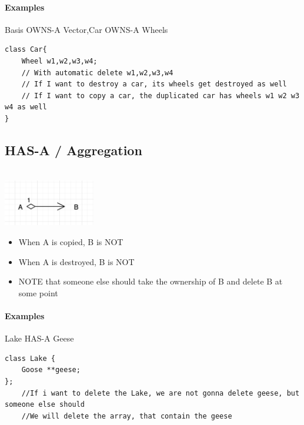 \documentclass{report}
\begin{document}
\paragraph{Examples} Basis OWNS-A Vector,Car OWNS-A Wheels
\begin{lstlisting}
class Car{
    Wheel w1,w2,w3,w4; 
    // With automatic delete w1,w2,w3,w4
    // If I want to destroy a car, its wheels get destroyed as well
    // If I want to copy a car, the duplicated car has wheels w1 w2 w3 w4 as well
}
\end{lstlisting}
\subsection{HAS-A / Aggregation}
\\
\includegraphics[width = 0.3\textwidth]{cs2}
\begin{itemize}
\item When A is copied, B is NOT
\item When A is destroyed, B is NOT
\item NOTE that someone else should take the ownership of B and delete B at some point
\end{itemize}
\paragraph{Examples}
Lake HAS-A Geese
\begin{lstlisting}
class Lake {
    Goose **geese;
};
    //If i want to delete the Lake, we are not gonna delete geese, but someone else should
    //We will delete the array, that contain the geese
\end{lstlisting}
\end{document}
